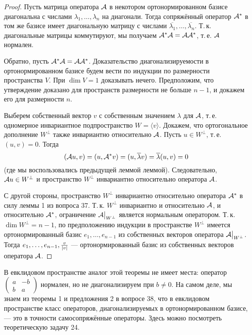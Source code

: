 \begin{proof}
    Пусть матрица оператора $\mathcal{A}$ в некотором ортонормированном базисе диагональна с числами $\lambda_1, \ldots, \lambda_n$ на диагонали. Тогда сопряжённый оператор $\mathcal{A}^\ast$ в том же базисе имеет диагональную матрицу с числами $\overline{\lambda_1}, \ldots, \overline{\lambda_n}$. Т.\,к. диагональные матрицы коммутируют, мы получаем $\mathcal{A}^\ast\mathcal{A} = \mathcal{A}\mathcal{A}^\ast$, т.\,е. $\mathcal{A}$ нормален.

    Обратно, пусть $\mathcal{A}^\ast\mathcal{A} = \mathcal{A}\mathcal{A}^\ast$. Доказательство диагонализируемости в ортонормированном базисе будем вести по индукции по размерности пространства $V$. При $\dim V = 1$ доказывать нечего. Предположим, что утверждение доказано для пространств размерности не больше $n - 1$, и докажем его для размерности $n$.

    Выберем собственный вектор $v$ с собственным значением $\lambda$ для $\mathcal{A}$, т.\,е. одномерное инвариантное подпространство $W = \langle v\rangle$. Докажем, что ортогональное дополнение $W^\perp$ также инвариантно относительно $\mathcal{A}$. Пусть $u \in W^\perp$, т.\,е. $(u, v) = 0$. Тогда
    \[
        (\mathcal{A} u, v) = (u, \mathcal{A}^\ast v) = (u, \overline{\lambda}v) = \overline{\lambda}(u, v) = 0
    \]
    (где мы воспользовались предыдущей леммой леммой). Следовательно, $\mathcal{A} u \in W^\perp$ и пространство $W^\perp$ инвариантно относительно оператора $\mathcal{A}$.

    С другой стороны, пространство $W^\perp$ инвариантно относительно оператора $\mathcal{A}^\ast$ в силу леммы 1 из вопроса 37. Т.\,к. $W^\perp$ инвариантно и относительно $\mathcal{A}$, и относительно $\mathcal{A}^\ast$, ограничение $\mathcal{A}\big|_{W^\perp}$ является нормальным оператором. Т.\,к. $\dim W^\perp = n - 1$, по предположению индукции в пространстве $W^\perp$ имеется ортонормированный базис $e_1, \ldots, e_{n - 1}$ из собственных векторов оператора $\mathcal{A}\big|_{W^\perp}$. Тогда $e_1, \ldots, e_{n - 1}, \frac{v}{\left\lvert v\right\rvert}$ --- ортонормированный базис из собственных векторов оператора $\mathcal{A}$.
\end{proof}

В евклидовом пространстве аналог этой теоремы не имеет места: оператор
$
\begin{pmatrix}
    a & -b\\
    b & a
\end{pmatrix}
$ нормален, но не диагонализируем при $b \ne 0$. На самом деле, мы знаем из теоремы 1 и предложения 2 в вопросе 38, что в евклидовом пространстве класс операторов, диагонализируемых в ортонормированном базисе, --- это в точности самосопряжённые операторы. Здесь можно посмотреть теоретическую задачу 24.

